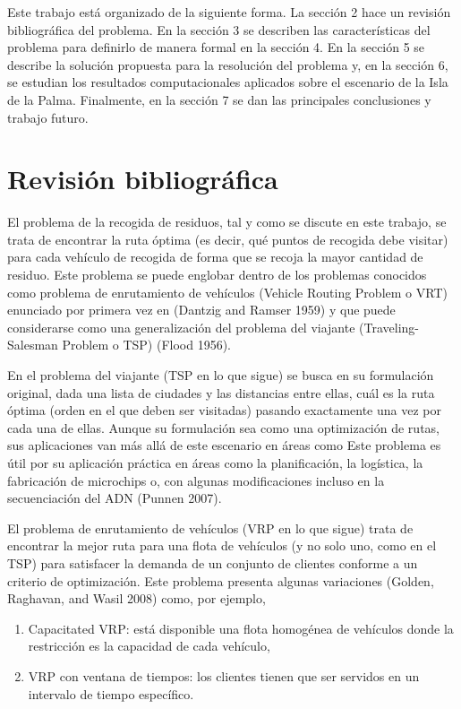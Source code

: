 \documentclass[
]{article}
\providecommand{\tightlist}{%
  \setlength{\itemsep}{0pt}\setlength{\parskip}{0pt}}
\begin{document}
Este trabajo está organizado de la siguiente forma. La sección 2 hace un
revisión bibliográfica del problema. En la sección 3 se describen las
características del problema para definirlo de manera formal en la
sección 4. En la sección 5 se describe la solución propuesta para la
resolución del problema y, en la sección 6, se estudian los resultados
computacionales aplicados sobre el escenario de la Isla de la Palma.
Finalmente, en la sección 7 se dan las principales conclusiones y
trabajo futuro.

\hypertarget{revisiuxf3n-bibliogruxe1fica}{%
\section{Revisión bibliográfica}\label{revisiuxf3n-bibliogruxe1fica}}

El problema de la recogida de residuos, tal y como se discute en este
trabajo, se trata de encontrar la ruta óptima (es decir, qué puntos de
recogida debe visitar) para cada vehículo de recogida de forma que se
recoja la mayor cantidad de residuo. Este problema se puede englobar
dentro de los problemas conocidos como problema de enrutamiento de
vehículos (Vehicle Routing Problem o VRT) enunciado por primera vez en
(Dantzig and Ramser 1959) y que puede considerarse como una
generalización del problema del viajante (Traveling-Salesman Problem o
TSP) (Flood 1956).

En el problema del viajante (TSP en lo que sigue) se busca en su
formulación original, dada una lista de ciudades y las distancias entre
ellas, cuál es la ruta óptima (orden en el que deben ser visitadas)
pasando exactamente una vez por cada una de ellas. Aunque su formulación
sea como una optimización de rutas, sus aplicaciones van más allá de
este escenario en áreas como Este problema es útil por su aplicación
práctica en áreas como la planificación, la logística, la fabricación de
microchips o, con algunas modificaciones incluso en la secuenciación del
ADN (Punnen 2007).

El problema de enrutamiento de vehículos (VRP en lo que sigue) trata de
encontrar la mejor ruta para una flota de vehículos (y no solo uno, como
en el TSP) para satisfacer la demanda de un conjunto de clientes
conforme a un criterio de optimización. Este problema presenta algunas
variaciones (Golden, Raghavan, and Wasil 2008) como, por ejemplo,

\begin{enumerate}
\def\labelenumi{(\roman{enumi})}
\tightlist
\item
  Capacitated VRP: está disponible una flota homogénea de vehículos
  donde la restricción es la capacidad de cada vehículo,
\item
  VRP con ventana de tiempos: los clientes tienen que ser servidos en un
  intervalo de tiempo específico.
\end{enumerate}
\end{document}
